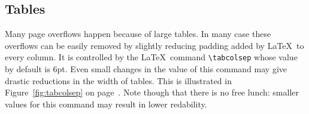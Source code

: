 \documentclass{easychair}
\begin{document}
\subsection{Tables}

Many page overflows happen because of large tables. In many case these
overflows can be easily removed by slightly reducing padding added by
\LaTeX\ to every column. It is controlled by the \LaTeX\ command
\verb|\tabcolsep| whose value by default is 6pt. Even small changes in
the value of this command may give drastic reductions in the width of
tables. This is illustrated in Figure~\ref{fig:tabcolsep} on
page~\pageref{fig:tabcolsep}. Note though that there is no free lunch:
smaller values for this command may result in lower redability.

\end{document}
